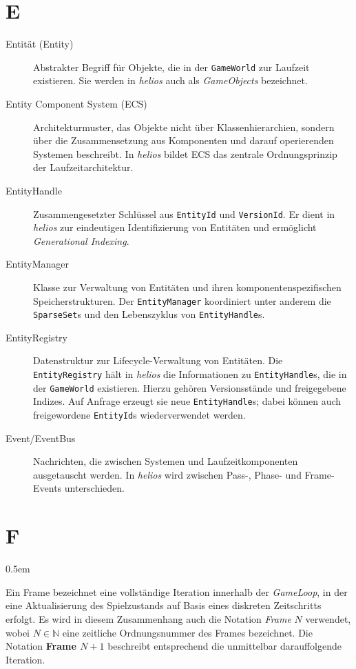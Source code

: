 \section*{E}

\begin{description}
    \item[Entität (Entity)] Abstrakter Begriff für Objekte, die in der \texttt{GameWorld} zur Laufzeit existieren.
    Sie werden in \textit{helios} auch als \textit{GameObjects} bezeichnet.

    \item[Entity Component System (ECS)] Architekturmuster, das Objekte nicht über Klassenhierarchien, sondern über die Zusammensetzung aus Komponenten und darauf operierenden Systemen beschreibt.
    In \textit{helios} bildet ECS das zentrale Ordnungsprinzip der Laufzeitarchitektur.

    \item[EntityHandle] Zusammengesetzter Schlüssel aus \texttt{EntityId} und \texttt{VersionId}.
    Er dient in \textit{helios} zur eindeutigen Identifizierung von Entitäten und ermöglicht \textit{Generational Indexing}.

    \item[EntityManager] Klasse zur Verwaltung von Entitäten und ihren komponentenspezifischen Speicherstrukturen.
    Der \texttt{EntityManager} koordiniert unter anderem die \texttt{SparseSet}s und den Lebenszyklus von \texttt{EntityHandle}s.

    \item[EntityRegistry] Datenstruktur zur Lifecycle-Verwaltung von Entitäten.
    Die \texttt{EntityRegistry} hält in \textit{helios} die Informationen zu \texttt{EntityHandle}s, die in der \texttt{GameWorld} existieren.
    Hierzu gehören Versionsstände und freigegebene Indizes.
    Auf Anfrage erzeugt sie neue \texttt{EntityHandle}s; dabei können auch freigewordene \texttt{EntityId}s wiederverwendet werden.

    \item[Event/EventBus] Nachrichten, die zwischen Systemen und Laufzeitkomponenten ausgetauscht werden.
    In \textit{helios} wird zwischen Pass-, Phase- und Frame-Events unterschieden.
\end{description}

\section*{F}

\begin{description}
    \itemsep0.5em
    \item[Frame] Ein Frame bezeichnet eine vollständige Iteration innerhalb der \textit{GameLoop}, in der eine Aktualisierung des Spielzustands auf Basis eines diskreten Zeitschritts erfolgt.
    Es wird in diesem Zusammenhang auch die Notation \textit{Frame} $N$ verwendet, wobei $N \in \mathbb{N}$ eine zeitliche Ordnungsnummer des Frames bezeichnet.
    Die Notation \textbf{Frame $N+1$} beschreibt entsprechend die unmittelbar darauffolgende Iteration.
\end{description}

